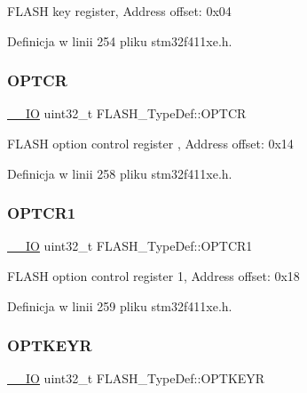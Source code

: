 F\+L\+A\+SH key register, Address offset\+: 0x04 

Definicja w linii 254 pliku stm32f411xe.\+h.

\mbox{\label{struct_f_l_a_s_h___type_def_a54026c3b5bc2059f1b187acb6c4817ac}} 
\subsubsection{\texorpdfstring{O\+P\+T\+CR}{OPTCR}}
{\footnotesize\ttfamily \hyperlink{core__sc300_8h_aec43007d9998a0a0e01faede4133d6be}{\+\_\+\+\_\+\+IO} uint32\+\_\+t F\+L\+A\+S\+H\+\_\+\+Type\+Def\+::\+O\+P\+T\+CR}

F\+L\+A\+SH option control register , Address offset\+: 0x14 

Definicja w linii 258 pliku stm32f411xe.\+h.

\mbox{\label{struct_f_l_a_s_h___type_def_a180354afdf5ff27d04befd794c46156d}} 
\subsubsection{\texorpdfstring{O\+P\+T\+C\+R1}{OPTCR1}}
{\footnotesize\ttfamily \hyperlink{core__sc300_8h_aec43007d9998a0a0e01faede4133d6be}{\+\_\+\+\_\+\+IO} uint32\+\_\+t F\+L\+A\+S\+H\+\_\+\+Type\+Def\+::\+O\+P\+T\+C\+R1}

F\+L\+A\+SH option control register 1, Address offset\+: 0x18 

Definicja w linii 259 pliku stm32f411xe.\+h.

\mbox{\label{struct_f_l_a_s_h___type_def_a793cd13a4636c9785fdb99316f7fd7ab}} 
\subsubsection{\texorpdfstring{O\+P\+T\+K\+E\+YR}{OPTKEYR}}
{\footnotesize\ttfamily \hyperlink{core__sc300_8h_aec43007d9998a0a0e01faede4133d6be}{\+\_\+\+\_\+\+IO} uint32\+\_\+t F\+L\+A\+S\+H\+\_\+\+Type\+Def\+::\+O\+P\+T\+K\+E\+YR}

